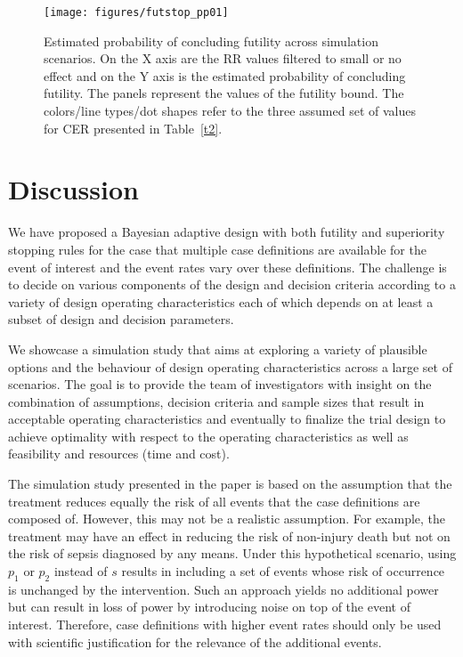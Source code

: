 \documentclass[12pt]{article}
\begin{document}
\begin{figure}[t]
	
	\centering
	\texttt{[image: figures/futstop\_pp01]}
	\caption{Estimated probability of concluding futility across simulation scenarios. On the X axis are the RR values filtered to small or no effect and on the Y axis is the estimated probability of concluding futility. The panels represent the values of the futility bound. The colors/line types/dot shapes refer to the three assumed set of values for CER presented in Table~\ref{t2}.}
	\label{fig:fut}
	
\end{figure}


\section{Discussion}\label{Sec:dis}
We have proposed a Bayesian adaptive design with both futility and superiority stopping rules for the case that multiple case definitions are available for the event of interest and the event rates vary over these definitions. The challenge is to decide on various components of the design and decision criteria according to a variety of design operating characteristics each of which depends on at least a subset of design and decision parameters. 

We showcase a simulation study that aims at exploring a variety of plausible options and the behaviour of design operating characteristics across a large set of scenarios. The goal is to provide the team of investigators with insight on the combination of assumptions, decision criteria and sample sizes that result in acceptable operating characteristics and eventually to finalize the trial design to achieve optimality with respect to the operating characteristics as well as feasibility and resources (time and cost).

The simulation study presented in the paper is based on the assumption that the treatment reduces equally the risk of all events that the case definitions are composed of. However, this may not be a realistic assumption. For example, the treatment may have an effect in reducing the risk of non-injury death but not on the risk of sepsis diagnosed by any means. Under this hypothetical scenario, using $p_1$ or $p_2$ instead of $s$ results in including a set of events whose risk of occurrence is unchanged by the intervention. Such an approach yields no additional power but can result in loss of power by introducing noise on top of the event of interest. Therefore, case definitions with higher event rates should only be used with scientific justification for the relevance of the additional events.
\end{document}
